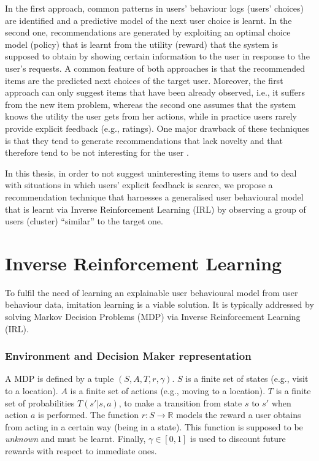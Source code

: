 In the first approach, common patterns in users' behaviour logs (users' choices) are identified and a predictive model of the next user choice is learnt. In the second one, recommendations are generated by exploiting an optimal choice model (policy) that is learnt from the utility (reward) that the system is supposed to obtain by showing certain information to the user in response to the user's requests. A common feature of both approaches is that the recommended items are the predicted next choices of the target user. Moreover, the first approach can only suggest items that have been already observed, i.e., it suffers from the new item problem, whereas the second one assumes that the system knows the utility the user gets from her actions, while in practice users rarely provide explicit feedback (e.g., ratings). One major drawback of these techniques is that they tend to generate recommendations that lack novelty and that therefore tend to be not interesting for the user \cite{vargas2011}. \newline

In this thesis, in order to not suggest uninteresting items to users and to deal with situations in which users' explicit feedback is scarce, we propose a recommendation technique that harnesses a generalised user behavioural model that is learnt via Inverse Reinforcement Learning (IRL) by observing a group of users (cluster) ``similar'' to the target one.

\section{Inverse Reinforcement Learning}

To fulfil the need of learning an explainable user behavioural model from user behaviour data, imitation learning is a viable solution. It is typically addressed by solving Markov Decision Problems (MDP) via Inverse Reinforcement Learning (IRL)\cite{ng:2000}.

\subsubsection{Environment and Decision Maker representation}

A MDP is defined by a tuple $(S,A,T,r,\gamma)$. $S$ is a finite set of states (e.g., visit to a location). $A$ is a finite set of actions (e.g., moving to a location). $T$ is a finite set of probabilities $T(s'| s, a)$, to make a transition from state $s$ to $s'$ when action $a$ is performed.
The function $r: S \rightarrow \mathbb{R}$ models the reward a user obtains from acting in a certain way (being in a state). This function is supposed to be {\it unknown} and must be learnt.
Finally, $\gamma \in [0,1]$ is used to discount future rewards with respect to immediate ones. 

